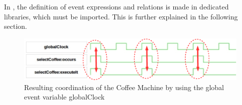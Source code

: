 In \bcool, the definition of event expressions and relations is made in dedicated libraries, which must be imported. This is further explained in the following section.
	
		
		\begin{figure}[h]
			\center
			\includegraphics[width=.8\textwidth]{bcool/figs/runningeventvar}
			\caption{Resulting coordination of the Coffee Machine by using the global event variable globalClock}
			\label{fig:runningeventvar}
		\end{figure}
		
	
	



